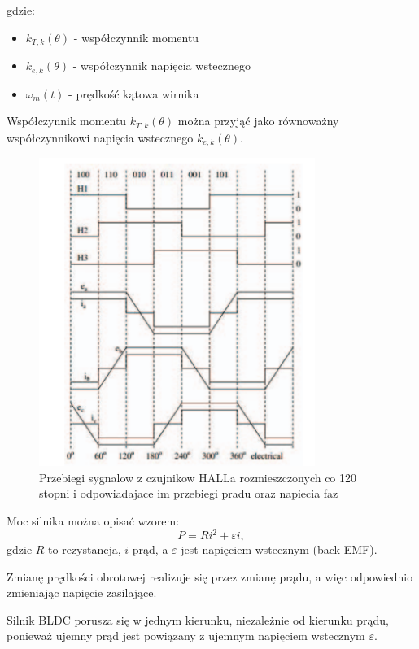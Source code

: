 \documentclass[11pt]{article}
\begin{document}
gdzie:
\begin{itemize}
\item $k_{T,k}(\theta)$ - współczynnik momentu
\item $k_{e,k}(\theta)$ - współczynnik napięcia wstecznego
\item $\omega_m(t)$ - prędkość kątowa wirnika
\end{itemize}

Współczynnik momentu $k_{T,k}(\theta)$ można przyjąć jako równoważny współczynnikowi napięcia wstecznego $k_{e,k}(\theta)$.

\begin{figure}[H]
\centering
\includegraphics[width=0.8\textwidth]{aun2_trapezoid_chart.png}
\caption{Przebiegi sygnalow z czujnikow HALLa rozmieszczonych co 120 stopni i odpowiadajace im przebiegi pradu oraz napiecia faz}
\end{figure}

\medskip
\noindent
Moc silnika można opisać wzorem:
\[
P = R i^2 + \varepsilon i,
\]
gdzie \( R \) to rezystancja, \( i \) prąd, a \( \varepsilon \) jest napięciem wstecznym (back-EMF).

\medskip
\noindent
Zmianę prędkości obrotowej realizuje się przez zmianę prądu, a więc odpowiednio zmieniając napięcie zasilające.

Silnik BLDC porusza się w jednym kierunku, niezależnie od kierunku prądu, ponieważ ujemny prąd jest powiązany z ujemnym napięciem wstecznym \(\varepsilon\).
\end{document}
